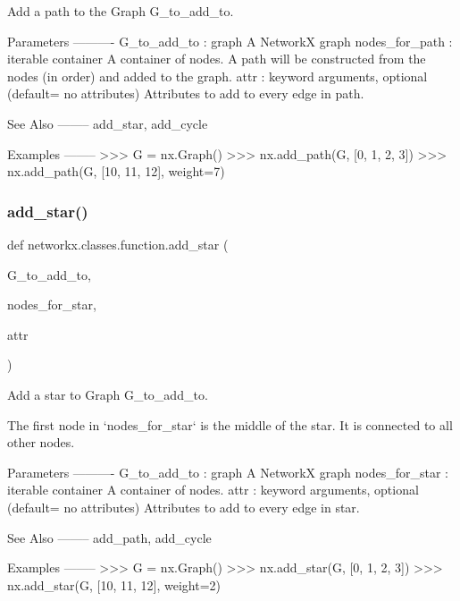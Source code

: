 \begin{DoxyVerb}Add a path to the Graph G_to_add_to.

Parameters
----------
G_to_add_to : graph
    A NetworkX graph
nodes_for_path : iterable container
    A container of nodes.  A path will be constructed from
    the nodes (in order) and added to the graph.
attr : keyword arguments, optional (default= no attributes)
    Attributes to add to every edge in path.

See Also
--------
add_star, add_cycle

Examples
--------
>>> G = nx.Graph()
>>> nx.add_path(G, [0, 1, 2, 3])
>>> nx.add_path(G, [10, 11, 12], weight=7)
\end{DoxyVerb}
 \mbox{\label{namespacenetworkx_1_1classes_1_1function_a3ef5d5719b3cee2143f426efb16166af}} 
\subsubsection{\texorpdfstring{add\+\_\+star()}{add\_star()}}
{\footnotesize\ttfamily def networkx.\+classes.\+function.\+add\+\_\+star (\begin{DoxyParamCaption}\item[{}]{G\+\_\+to\+\_\+add\+\_\+to,  }\item[{}]{nodes\+\_\+for\+\_\+star,  }\item[{}]{attr }\end{DoxyParamCaption})}

\begin{DoxyVerb}Add a star to Graph G_to_add_to.

The first node in `nodes_for_star` is the middle of the star.
It is connected to all other nodes.

Parameters
----------
G_to_add_to : graph
    A NetworkX graph
nodes_for_star : iterable container
    A container of nodes.
attr : keyword arguments, optional (default= no attributes)
    Attributes to add to every edge in star.

See Also
--------
add_path, add_cycle

Examples
--------
>>> G = nx.Graph()
>>> nx.add_star(G, [0, 1, 2, 3])
>>> nx.add_star(G, [10, 11, 12], weight=2)
\end{DoxyVerb}
 \mbox{\label{namespacenetworkx_1_1classes_1_1function_a4e5fbe4b8298af9096b2f41ab421c66f}} 
